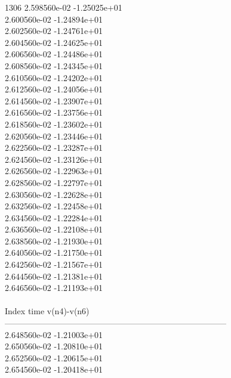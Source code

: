 1306	2.598560e-02	-1.25025e+01	\\ 	2.600560e-02	-1.24894e+01	\\ 	2.602560e-02	-1.24761e+01	\\ 	2.604560e-02	-1.24625e+01	\\ 	2.606560e-02	-1.24486e+01	\\ 	2.608560e-02	-1.24345e+01	\\ 	2.610560e-02	-1.24202e+01	\\ 	2.612560e-02	-1.24056e+01	\\ 	2.614560e-02	-1.23907e+01	\\ 	2.616560e-02	-1.23756e+01	\\ 	2.618560e-02	-1.23602e+01	\\ 	2.620560e-02	-1.23446e+01	\\ 	2.622560e-02	-1.23287e+01	\\ 	2.624560e-02	-1.23126e+01	\\ 	2.626560e-02	-1.22963e+01	\\ 	2.628560e-02	-1.22797e+01	\\ 	2.630560e-02	-1.22628e+01	\\ 	2.632560e-02	-1.22458e+01	\\ 	2.634560e-02	-1.22284e+01	\\ 	2.636560e-02	-1.22108e+01	\\ 	2.638560e-02	-1.21930e+01	\\ 	2.640560e-02	-1.21750e+01	\\ 	2.642560e-02	-1.21567e+01	\\ 	2.644560e-02	-1.21381e+01	\\ 	2.646560e-02	-1.21193e+01	\\ \hline
\\ \hline
Index   time            v(n4)-v(n6)     \\ \hline
--------------------------------------------------------------------------------\\ 	2.648560e-02	-1.21003e+01	\\ 	2.650560e-02	-1.20810e+01	\\ 	2.652560e-02	-1.20615e+01	\\ 	2.654560e-02	-1.20418e+01	\\ \hline
